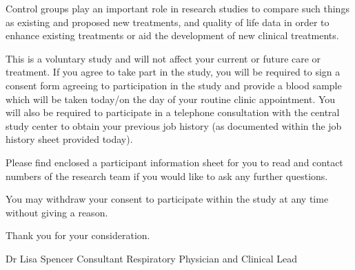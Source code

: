 \documentclass[a4paper,10pt]{article}
\begin{document}
Control groups play an important role in research studies to compare such things as existing and proposed new treatments, and quality of life data in order to enhance existing treatments or aid the development of new clinical treatments.

This is a voluntary study and will not affect your current or future care or treatment. If you agree to take part in the study, you will be required to sign a consent form agreeing to participation in the study and provide a blood sample which will be taken today/on the day of your routine clinic appointment. You will also be required to participate in a telephone consultation with the central study center to obtain your previous job history (as documented within the job history sheet provided today). 

Please find enclosed a participant information sheet for you to read and contact numbers of the research team if you would like to ask any further questions.

You may withdraw your consent to participate within the study at any time without giving a reason. 

Thank you for your consideration.

\vspace{2cm}

Dr Lisa Spencer
Consultant Respiratory Physician and Clinical Lead

 
\end{document}
